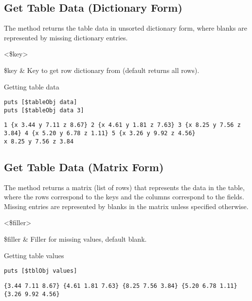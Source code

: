 \documentclass{article}
\begin{document}
\clearpage
\subsection{Get Table Data (Dictionary Form)}
The method  returns the table data in unsorted dictionary form, where blanks are represented by missing dictionary entries. 
\begin{syntax}
 <\$key>
\end{syntax}
\begin{args}
\$key & Key to get row dictionary from (default returns all rows). 
\end{args}

\begin{example}{Getting table data}
\begin{lstlisting}
puts [$tableObj data]
puts [$tableObj data 3]
\end{lstlisting}
\tcblower
\begin{lstlisting}
1 {x 3.44 y 7.11 z 8.67} 2 {x 4.61 y 1.81 z 7.63} 3 {x 8.25 y 7.56 z 3.84} 4 {x 5.20 y 6.78 z 1.11} 5 {x 3.26 y 9.92 z 4.56}
x 8.25 y 7.56 z 3.84
\end{lstlisting}
\end{example}

\subsection{Get Table Data (Matrix Form)}
The method  returns a matrix (list of rows) that represents the data in the table, where the rows correspond to the keys and the columns correspond to the fields. Missing entries are represented by blanks in the matrix unless specified otherwise.
\begin{syntax}
 <\$filler>
\end{syntax}
\begin{args}
\$filler & Filler for missing values, default blank.
\end{args}
\begin{example}{Getting table values}
\begin{lstlisting}
puts [$tblObj values]
\end{lstlisting}
\tcblower
\begin{lstlisting}
{3.44 7.11 8.67} {4.61 1.81 7.63} {8.25 7.56 3.84} {5.20 6.78 1.11} {3.26 9.92 4.56}
\end{lstlisting}
\end{example}
\clearpage
\end{document}
